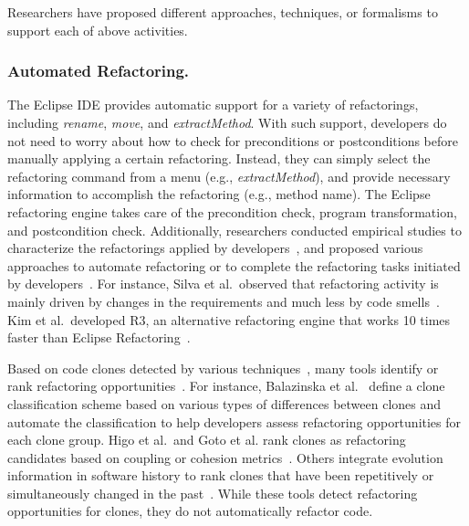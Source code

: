 \documentclass[runningheads,a4paper]{llncs}
\begin{document}
Researchers have proposed different approaches, techniques, or formalisms to support each of above activities.

\subsubsection{Automated Refactoring.} 

The Eclipse IDE provides automatic support for a variety of refactorings, including \emph{rename}, \emph{move}, and \emph{extractMethod}. With such support, developers do not need to worry about how to check for preconditions or postconditions before manually applying a certain refactoring. Instead, they can simply select the refactoring command from a menu (e.g., \emph{extractMethod}), and provide necessary information to accomplish the refactoring (e.g., method name). The Eclipse refactoring engine takes care of the precondition check, program transformation, and postcondition check. Additionally, 
researchers conducted empirical studies to characterize the refactorings applied by developers~\cite{Kim2012:FSR,Murphy-Hill2012:refactor,Vakilian:2012,Silva2016:WWR}, and proposed various approaches to automate refactoring or to complete the refactoring tasks initiated by developers~\cite{Griswold:1992,Balazinska1999,Dig:2009,Ge:2012,Chen:2013,Lee:2013,Tsantalis2013:icsm,Meng2015:ARO,Kim:2016}. For instance, Silva et al.~observed that refactoring activity is mainly driven by changes in the requirements and much less by code smells~\cite{Silva2016:WWR}. Kim et al.~developed R3, an alternative refactoring engine that works 10 times faster than Eclipse Refactoring~\cite{Kim:2016}. 

Based on code clones detected by various techniques~\cite{Kamiya2002,Jiang2007a,Krinke2001:PDG}, many tools identify or rank refactoring opportunities~\cite{Balazinska1999a, Higo2008:metricrefactoring, goto2013extract, higo2013identifying, Tsantalis2011:rankRefactoring}. For instance, Balazinska et al.~\cite{Balazinska1999a} define a clone classification scheme based on various types of differences between clones and automate the classification to help developers assess refactoring opportunities for each clone group. Higo et al.~and Goto et al.\/ rank clones as refactoring candidates based on coupling or cohesion metrics~\cite{Higo2008:metricrefactoring,goto2013extract}. Others integrate evolution information in software history to rank clones that have been repetitively or simultaneously changed in the past~\cite{higo2013identifying, Tsantalis2011:rankRefactoring}. While these tools detect refactoring opportunities for clones, they do not automatically refactor code.
\end{document}
